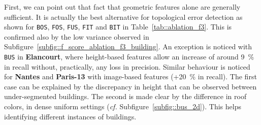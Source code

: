         \begin{figure}[htpb]
            \centering
        \end{figure}

        First, we can point out that fact that geometric features alone are generally sufficient.
        It is actually the best alternative for topological error detection as shown for \texttt{BOS}, \texttt{FOS}, \texttt{FUS}, \texttt{FIT} and \texttt{BIT} in Table~\ref{tab::ablation_f3}.
        This is confirmed also by the low variance observed in Subfigure~\ref{subfig::f_score_ablation_f3_building}.
        An exception is noticed with \texttt{BUS} in \textbf{Elancourt}, where height-based features allow an increase of around \SI{9}{\percent} in recall without, practically, any loss in precision.
        Similar behaviour is noticed for \textbf{Nantes} and \textbf{Paris-13} with image-based features (+\SI{20}{\percent} in recall).
        The first case can be explained by the discrepancy in height that can be observed between under-segmented buildings.
        The second is made clear by the difference in roof colors, in dense uniform settings (\textit{cf.} Subfigure~\ref{subfig::bus_2d}).
        This helps identifying different instances of buildings.\\

